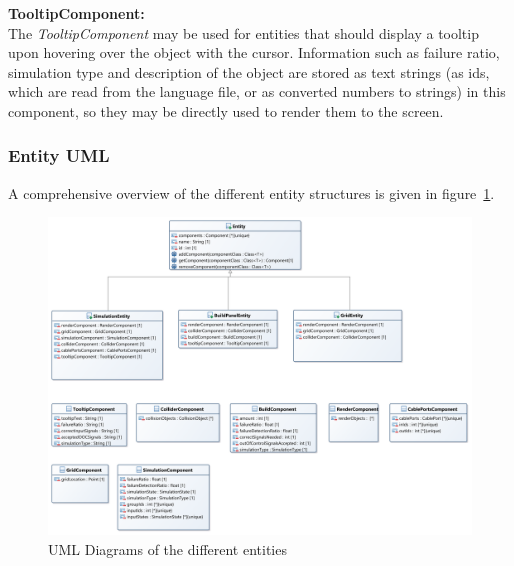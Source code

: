 \textbf{TooltipComponent:} \\
The \textit{TooltipComponent} may be used for entities that should display a tooltip upon hovering over the object with the cursor.
Information such as failure ratio, simulation type and description of the object are stored as text strings (as ids, which are read
from the language file, or as converted numbers to strings) in this component, so they may be directly used to render them to
the screen.
\subsubsection{Entity UML}\label{subsubsec:entity-uml}
A comprehensive overview of the different entity structures is given in figure~\ref{fig:entities}.
\begin{figure}
    \centering
    \includegraphics[width=\textwidth]{Pictures/res/implementation/entities}
    \caption{UML Diagrams of the different entities}
    \label{fig:entities}
\end{figure}
